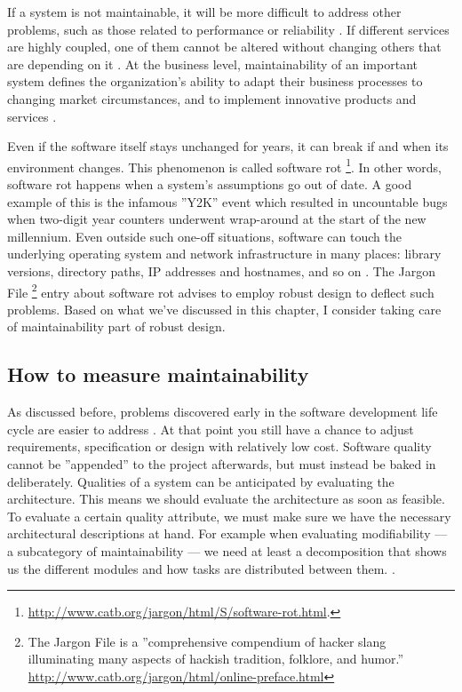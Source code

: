 \documentclass[utf8,english]{gradu3}
\begin{document}
If a system is not maintainable, it will be more difficult to address other
problems, such as those related to performance or reliability \parencite[46]{Bouwers2010}.
If different services are highly coupled, one of them cannot be altered without changing
others that are depending on it \parencite[2]{Vale2022}. At the business level,
maintainability of an important system defines the organization's ability to
adapt their business processes to changing market circumstances, and to
implement innovative products and services \parencite[21]{Broy2006}.

Even if the software itself stays unchanged for years, it can break if and when
its environment changes. This phenomenon is called software rot
\footnote{\url{http://www.catb.org/jargon/html/S/software-rot.html}.}. In other
words, software rot happens when a system's assumptions go out of date. A good
example of this is the infamous ''Y2K'' event which resulted in uncountable bugs
when two-digit year counters underwent wrap-around at the start of the new
millennium. Even outside such one-off situations, software can touch the
underlying operating system and network infrastructure in many places: library
versions, directory paths, IP addresses and hostnames, and so on
\parencite{Heroku2011}. The Jargon File \footnote{The Jargon File is a
  ''comprehensive compendium of hacker slang illuminating many aspects of hackish
  tradition, folklore, and humor.''
  \url{http://www.catb.org/jargon/html/online-preface.html}} entry about software
rot advises to employ robust design to deflect such problems. Based on what
we've discussed in this chapter, I consider taking care of maintainability part
of robust design.


\subsection{How to measure maintainability}

As discussed before, problems discovered early in the software development life
cycle are easier to address \parencite{Bass1998}. At that point you still have a
chance to adjust requirements, specification or design with relatively low cost.
Software quality cannot be ''appended'' to the project afterwards, but must
instead be baked in deliberately. Qualities of a system can be anticipated by
evaluating the architecture. This means we should evaluate the architecture as
soon as feasible. To evaluate a certain quality attribute, we must make sure we
have the necessary architectural descriptions at hand. For example when
evaluating modifiability --- a subcategory of maintainability --- we need at
least a decomposition that shows us the different modules and how tasks are
distributed between them. \parencite[32, 190-191]{Bass1998}.
\end{document}
